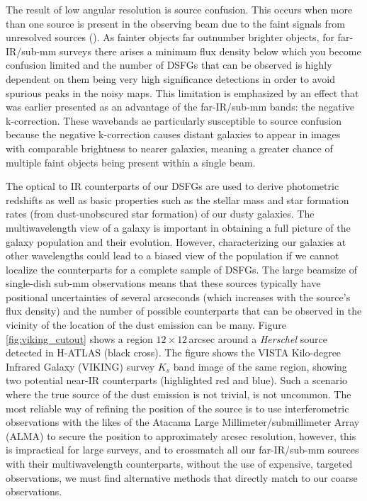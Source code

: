 The result of low angular resolution is source confusion. This occurs when more than one source is present in the observing beam due to the faint signals from unresolved sources (\citealt{Condon_1974}). As fainter objects far outnumber brighter objects, for far-IR/sub-mm surveys there arises a minimum flux density below which you become confusion limited and the number of DSFGs that can be observed is highly dependent on them being very high significance detections in order to avoid spurious peaks in the noisy maps. This limitation is emphasized by an effect that was earlier presented as an advantage of the far-IR/sub-mm bands: the negative k-correction. These wavebands ae particularly susceptible to source confusion because the negative k-correction causes distant galaxies to appear in images with comparable brightness to nearer galaxies, meaning a greater chance of multiple faint objects being present within a single beam.

The optical to IR counterparts of our DSFGs are used to derive photometric redshifts as well as basic properties such as the stellar mass and star formation rates (from dust-unobscured star formation) of our dusty galaxies. The multiwavelength view of a galaxy is important in obtaining a full picture of the galaxy population and their evolution. However, characterizing our galaxies at other wavelengths could lead to a biased view of the population if we cannot localize the counterparts for a complete sample of DSFGs. The large beamsize of single-dish sub-mm observations means that these sources typically have positional uncertainties of several arcseconds (which increases with the source's flux density) and the number of possible counterparts that can be observed in the vicinity of the location of the dust emission can be many. Figure \ref{fig:viking_cutout} shows a region $12\times12\,$arcsec around a \textit{Herschel} source detected in H-ATLAS (black cross). The figure shows the VISTA Kilo-degree Infrared Galaxy (VIKING) survey $K_s$ band image of the same region, showing two potential near-IR counterparts (highlighted red and blue). Such a scenario where the true source of the dust emission is not trivial, is not uncommon. The most reliable way of refining the position of the source is to use interferometric observations with the likes of the Atacama Large Millimeter/submillimeter Array (ALMA) to secure the position to approximately arcsec resolution, however, this is impractical for large surveys, and to crossmatch all our far-IR/sub-mm sources with their multiwavelength counterparts, without the use of expensive, targeted observations, we must find alternative methods that directly match to our coarse observations.


